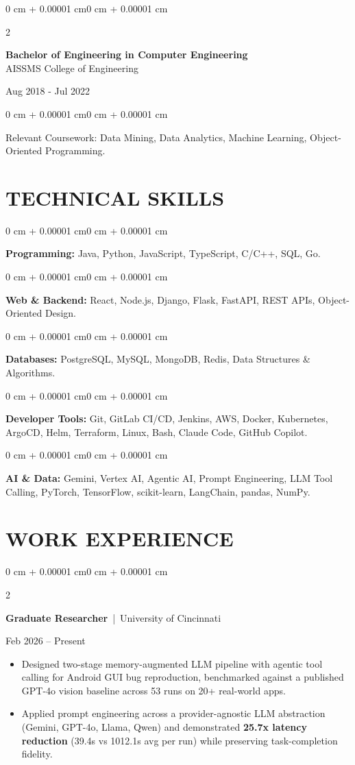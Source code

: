 \documentclass[10pt, letterpaper]{article}
\newenvironment{highlights}{
    \begin{itemize}[
        topsep=0.10 cm,
        parsep=0.06 cm,
        partopsep=0pt,
        itemsep=0.06 cm,
        leftmargin=12pt
    ]
}{
    \end{itemize}
}
\newenvironment{onecolentry}{
    \begin{adjustwidth}{0 cm + 0.00001 cm}{0 cm + 0.00001 cm}
}{
    \end{adjustwidth}
}
\newenvironment{twocolentry}[2][]{
    \onecolentry
    \def\secondColumn{#2}
    \setcolumnwidth{\fill, 4.5 cm}
    \begin{paracol}{2}
}{
    \switchcolumn \raggedleft \secondColumn
    \end{paracol}
    \endonecolentry
}
\begin{document}
\begin{twocolentry}{
    Aug 2018 - Jul 2022
}
    \textbf{Bachelor of Engineering in Computer Engineering} \\
    AISSMS College of Engineering
\end{twocolentry}
\begin{onecolentry}
Relevant Coursework: Data Mining, Data Analytics, Machine Learning, Object-Oriented Programming.
\end{onecolentry}
\section{TECHNICAL SKILLS}
\begin{onecolentry}
\textbf{Programming:} Java, Python, JavaScript, TypeScript, C/C++, SQL, Go.
\end{onecolentry}
\vspace{0.06 cm}
\begin{onecolentry}
\textbf{Web \& Backend:} React, Node.js, Django, Flask, FastAPI, REST APIs, Object-Oriented Design.
\end{onecolentry}
\vspace{0.06 cm}
\begin{onecolentry}
\textbf{Databases:} PostgreSQL, MySQL, MongoDB, Redis, Data Structures \& Algorithms.
\end{onecolentry}
\vspace{0.06 cm}
\begin{onecolentry}
\textbf{Developer Tools:} Git, GitLab CI/CD, Jenkins, AWS, Docker, Kubernetes, ArgoCD, Helm, Terraform, Linux, Bash, Claude Code, GitHub Copilot.
\end{onecolentry}
\vspace{0.06 cm}
\begin{onecolentry}
\textbf{AI \& Data:} Gemini, Vertex AI, Agentic AI, Prompt Engineering, LLM Tool Calling, PyTorch, TensorFlow, scikit-learn, LangChain, pandas, NumPy.
\end{onecolentry}

\section{WORK EXPERIENCE}
\begin{twocolentry}{Feb 2026 -- Present}
\textbf{Graduate Researcher} \,|\, University of Cincinnati
\end{twocolentry}
\begin{highlights}
  \item Designed two-stage memory-augmented LLM pipeline with agentic tool calling for Android GUI bug reproduction, benchmarked against a published GPT-4o vision baseline across 53 runs on 20+ real-world apps.
  \item Applied prompt engineering across a provider-agnostic LLM abstraction (Gemini, GPT-4o, Llama, Qwen) and demonstrated \textbf{25.7x latency reduction} (39.4s vs 1012.1s avg per run) while preserving task-completion fidelity.
\end{highlights}
\end{document}
